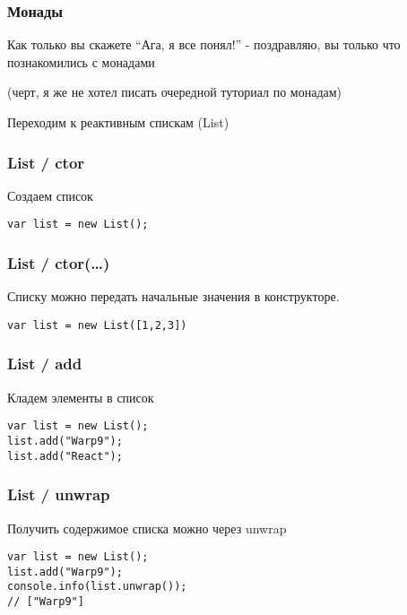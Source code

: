 \documentclass[xetex]{beamer}
\begin{document}
\begin{frame}[fragile]
\frametitle{Монады}
Как только вы скажете ``Ага, я все понял!'' - поздравляю, вы только что познакомились с монадами

\vspace{10mm}
{\color{comments-color}(черт, я же не хотел писать очередной туториал по монадам)}
\end{frame}


\begin{frame}
    Переходим к реактивным спискам (List)
\end{frame}

\lstset{
  xleftmargin=.2\textwidth, xrightmargin=.2\textwidth
}
\begin{frame}[fragile]
\frametitle{List / ctor}
Создаем список

\vspace{10mm}
\begin{lstlisting}
var list = new List();
\end{lstlisting}
\end{frame}


\begin{frame}[fragile]
\frametitle{List / ctor(\dots)}
Списку можно передать начальные значения в конструкторе.

\vspace{10mm}
\begin{lstlisting}
var list = new List([1,2,3])
\end{lstlisting}
\end{frame}


\begin{frame}[fragile]
\frametitle{List / add}
Кладем элементы в список

\vspace{10mm}
\begin{lstlisting}
var list = new List();
list.add("Warp9");
list.add("React");
\end{lstlisting}
\end{frame}


\begin{frame}[fragile]
\frametitle{List / unwrap}
Получить содержимое списка можно через unwrap

\vspace{10mm}
\begin{lstlisting}
var list = new List();
list.add("Warp9");
console.info(list.unwrap()); 
// ["Warp9"]
\end{lstlisting}
\end{frame}
\end{document}
